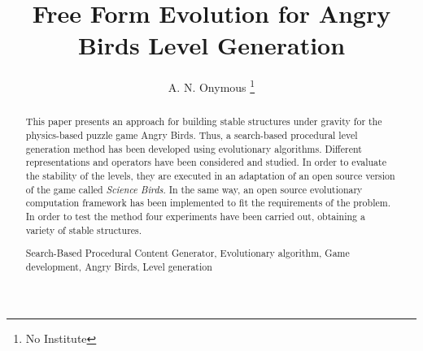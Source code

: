 \documentclass[runningheads,a4paper]{llncs}
\newcommand{\keywords}[1]{\par\addvspace\baselineskip
	\noindent\keywordname\enspace\ignorespaces#1}
\begin{document}
\mainmatter  %

\title{Free Form Evolution for Angry Birds Level Generation}

\titlerunning{}

%
%

\author{A. N. Onymous%
\thanks{No Institute}}



%
%

\maketitle

%
%
\begin{abstract}
This paper presents an approach for building stable structures under gravity for the physics-based puzzle game Angry Birds. Thus, a search-based procedural level 
generation method has been developed using evolutionary algorithms. Different 
representations and operators have been considered and studied. In order to evaluate the stability of the levels, they are executed in an adaptation of an open source version of the game called \textit{Science Birds}. 
In the same way, an open source evolutionary computation framework has been implemented to fit the requirements of the problem. In order to test the method four experiments have been carried out, obtaining a variety of stable structures.

\keywords{Search-Based Procedural Content Generator, Evolutionary algorithm, 
Game development, Angry Birds, Level generation}
\end{abstract}
\end{document}
